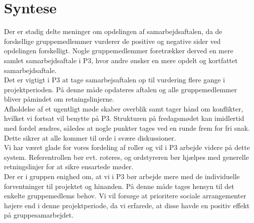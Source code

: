 \section{Syntese}
Der er stadig delte meninger om opdelingen af samarbejdsaftalen, da de forskellige gruppemedlemmer vurderer de positive og negative sider ved opdelingen forskelligt. Nogle gruppemedlemmer foretrækker derved en mere samlet samarbejdsaftale i P$3$, hvor andre ønsker en mere opdelt og kortfattet samarbejdsaftale. \\
Det er vigtigt i P$3$ at tage samarbejsaftalen op til vurdering flere gange i projektperioden. På denne måde opdateres aftalen og alle gruppemedlemmer bliver påmindet om retningslinjerne. \\
Afholdelse af et ugentligt møde skaber overblik samt tager hånd om konflikter, hvilket vi fortsat vil benytte på P$3$. Strukturen på fredagsmødet kan imidlertid med fordel ændres, således at nogle punkter tages ved en runde frem for fri snak. Dette sikrer at alle kommer til orde i svære diskussioner. \\
Vi har været glade for vores fordeling af roller og vil i P$3$ arbejde videre på dette system. Referentrollen bør evt. roteres, og ordstyreren bør hjælpes med generelle retningslinjer for at sikre ensartede møder. \\
Der er i gruppen enighed om, at vi i P$3$ bør arbejde mere med de individuelle forventninger til projektet og hinanden. På denne måde tages hensyn til det enkelte gruppemedlems behov. Vi vil forsøge at prioritere sociale arrangementer højere end i denne projektperiode, da vi erfarede, at disse havde en positiv effekt på gruppesamarbejdet.  